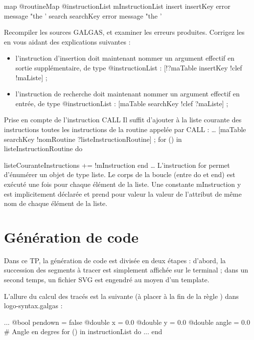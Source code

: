 \begin{galgascode}
map @routineMap {
  @instructionList mInstructionList
  insert insertKey  error message "the '%
  search searchKey error message "the '%
}
\end{galgascode}

Recompiler les sources GALGAS, et examiner les erreurs produites. Corrigez les en vous aidant des explications suivantes :
\begin{itemize}
  \item l'instruction d'insertion doit maintenant nommer un argument effectif en sortie supplémentaire, de type @instructionList :
[!?maTable insertKey !clef !maListe] ;
  \item l'instruction de recherche doit maintenant nommer un argument effectif en entrée, de type @instructionList :
[maTable searchKey !clef ?maListe] ;
\end{itemize}

Prise en compte de l'instruction CALL
Il suffit d'ajouter à la liste courante des instructions toutes les instructions de la routine appelée par CALL :
…
[maTable searchKey !nomRoutine ?listeInstructionRoutine] ;
for () in listeInstructionRoutine do

listeCouranteInstructions += !mInstruction
end
…
L'instruction for permet d’énumérer un objet de type liste. Le corps de la boucle (entre do et end) est exécuté une fois pour chaque élément de la liste. Une constante mInstruction y est implicitement déclarée et prend pour valeur la valeur de l’attribut de même nom de chaque élément de la liste.

\section{Génération de code}

Dans ce TP, la génération de code est divisée en deux étapes : d'abord, la succession des segments à tracer est simplement affichée sur le terminal ; dans un second temps, un fichier SVG est engendré au moyen d'un template.

L'allure du calcul des tracés est la suivante (à placer à la fin de la règle ) dans logo-syntax.galgas :

\begin{galgascode}
  ...
  @bool pendown = false
  @double x = 0.0
  @double y = 0.0
  @double angle = 0.0 # Angle en degres
  for () in instructionList do
    ...
  end
\end{galgascode}

